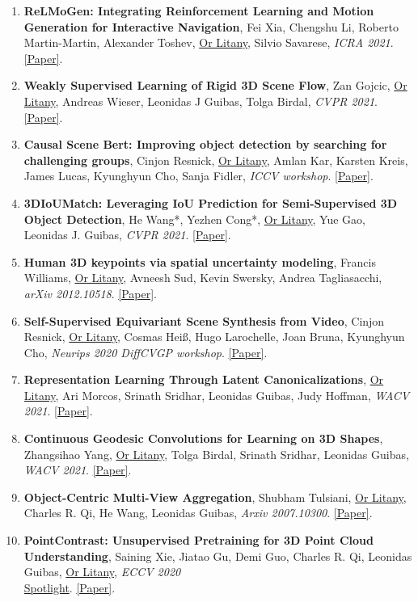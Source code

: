 \begin{enumerate}[leftmargin=*]
    \item \textbf{ReLMoGen: Integrating Reinforcement Learning and Motion Generation for Interactive Navigation}, Fei Xia, Chengshu Li, Roberto Martin-Martin, Alexander Toshev, \underline{Or Litany}, Silvio Savarese, \textit{ICRA 2021}. \href{https://arxiv.org/abs/2008.07792}{[Paper]}.
    \item \textbf{Weakly Supervised Learning of Rigid 3D Scene Flow}, Zan Gojcic, \underline{Or Litany}, Andreas Wieser, Leonidas J Guibas, Tolga Birdal, \textit{CVPR 2021}. \href{https://arxiv.org/abs/2102.08945}{[Paper]}.
    \item \textbf{Causal Scene Bert: Improving object detection by searching for challenging groups}, Cinjon Resnick, \underline{Or Litany}, Amlan Kar, Karsten Kreis, James Lucas, Kyunghyun Cho, Sanja Fidler, \textit{ICCV workshop}. \href{https://arxiv.org/abs/2202.03651}{[Paper]}.
    \item \textbf{3DIoUMatch: Leveraging IoU Prediction for Semi-Supervised 3D Object Detection}, He Wang*, Yezhen Cong*, \underline{Or Litany}, Yue Gao, Leonidas J. Guibas, \textit{CVPR 2021}. \href{https://arxiv.org/abs/2012.04355}{[Paper]}.
    \item \textbf{Human 3D keypoints via spatial uncertainty modeling}, Francis Williams, \underline{Or Litany}, Avneesh Sud, Kevin Swersky, Andrea Tagliasacchi, \textit{arXiv 2012.10518}. \href{https://arxiv.org/abs/2012.10518}{[Paper]}.
    \item \textbf{Self-Supervised Equivariant Scene Synthesis from Video}, Cinjon Resnick, \underline{Or Litany}, Cosmas Heiß, Hugo Larochelle, Joan Bruna, Kyunghyun Cho, \textit{Neurips 2020 DiffCVGP workshop}. \href{https://arxiv.org/abs/2011.05787v1}{[Paper]}.
    \item \textbf{Representation Learning Through Latent Canonicalizations}, \underline{Or Litany}, Ari Morcos, Srinath Sridhar, Leonidas Guibas, Judy Hoffman, \textit{WACV 2021}. \href{https://arxiv.org/abs/2002.11829}{[Paper]}.
    \item \textbf{Continuous Geodesic Convolutions for Learning on 3D Shapes}, Zhangsihao Yang, \underline{Or Litany}, Tolga Birdal, Srinath Sridhar, Leonidas Guibas, \textit{WACV 2021}. \href{https://arxiv.org/abs/2002.02506}{[Paper]}.
    \item \textbf{Object-Centric Multi-View Aggregation}, Shubham Tulsiani, \underline{Or Litany}, Charles R. Qi, He Wang, Leonidas Guibas, \textit{Arxiv 2007.10300}. \href{http://arxiv.org/abs/2007.10300}{[Paper]}.
    \item \textbf{PointContrast: Unsupervised Pretraining for 3D Point Cloud Understanding}, Saining Xie, Jiatao Gu, Demi Guo, Charles R. Qi, Leonidas Guibas, \underline{Or Litany}, \textit{ECCV 2020}\\ \underline{Spotlight}. \href{https://arxiv.org/abs/2007.10985}{[Paper]}.

\end{enumerate}
